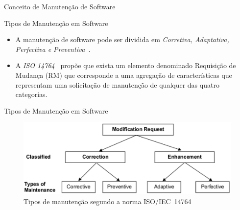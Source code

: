 \documentclass[t,14pt,mathserif]{beamer}
\begin{document}
\begin{frame}{Conceito de Manutenção de Software}
\end{frame}

\begin{frame}{Tipos de Manutenção em Software}
	\begin{itemize}
        \item A manutenção de software pode ser dividida em \textit{Corretiva,
                Adaptativa, Perfectiva e
                Preventiva}~\cite{Lientz:1980:SMM:601062,159342}.

        \item A \textit{ISO 14764}~\cite{1703974} propõe que exista um elemento
            denominado Requisição de Mudança (RM) que corresponde a uma
            agregação de características que representam uma solicitação de
            manutenção de qualquer das quatro categorias.
	\end{itemize}
\end{frame}

\begin{frame}{Tipos de Manutenção em Software}
    \begin{figure}[hbtp]
        \centering
        \includegraphics[width=.75\textwidth]{../img/modification_request.eps}
        \caption{Tipos de manutenção segundo a norma
                 ISO/IEC~14764~\cite{1703974}}
\label{fig:modification-request}
    \end{figure}
\end{frame}
\end{document}

